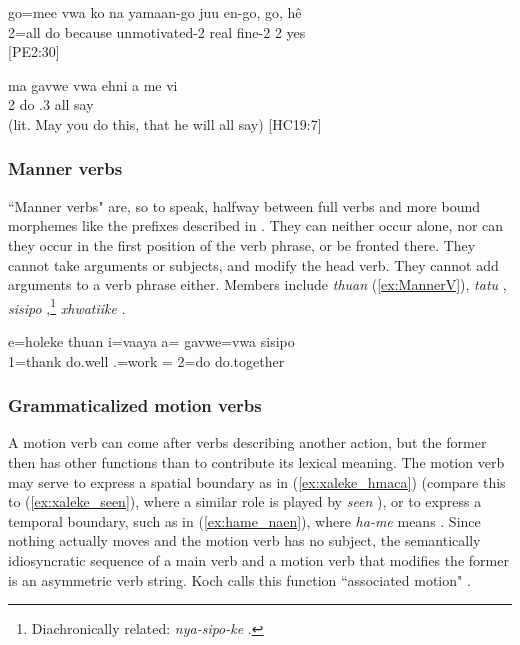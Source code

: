 \ea \label{ex:me2}
\gll go=mee vwa ko na yamaan-go juu en-go, go, hê \\ 
 2=all do because  unmotivated-2 real fine-2 2 yes\\ 
\glt {} {[PE2:30]}
\z


\ea \label{ex:mePV}
\gll ma gavwe vwa ehni a me vi\\ 
  2 do  .3 all say\\ 
\glt {} (lit. May you do this, that he will all say) {[HC19:7]}
\z

\subsubsection{Manner verbs}
\label{ssec:MannerV}
\noindent
``Manner verbs" are, so to speak, halfway between full verbs and more bound morphemes like the prefixes described in . They can neither occur alone, nor can they occur in the first position of the verb phrase, or be fronted there. They cannot take arguments or subjects, and modify the head verb. They cannot add arguments to a verb phrase either. 
Members include \textit{thuan}  (\ref{ex:MannerV}), \textit{tatu} , %
\textit{sisipo} ,\footnote{Diachronically related: \textit{nya-sipo-ke} .} \textit{xhwatiike} .


\ea  \label{ex:MannerV}
\gll e=holeke thuan i=vaaya a= gavwe=vwa sisipo\\ 
 1=thank do.well .=work = 2=do do.together\\ 
\glt {}
\z


\subsubsection{Grammaticalized motion verbs}
\label{ssec:gramm_mot_v}

A motion verb can come after verbs describing another action, but the former then has other functions than to contribute its lexical meaning. The motion verb may serve to express a spatial boundary as in (\ref{ex:xaleke_hmaca}) (compare this to (\ref{ex:xaleke_seen}), where a similar role is played by \textit{seen} ), or to express a temporal boundary, such as in (\ref{ex:hame_naen}), where \textit{ha-me}   means . Since nothing actually moves and the motion verb has no subject, the semantically idiosyncratic sequence of a main verb and a motion verb that modifies the former is an asymmetric verb string. Koch calls this function ``associated motion" \parencite{koch_associated_2021}.

